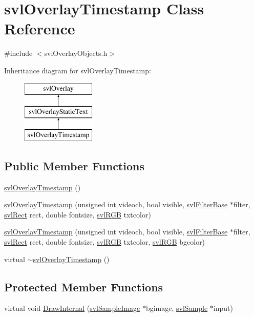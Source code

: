 \hypertarget{classsvl_overlay_timestamp}{}\section{svl\+Overlay\+Timestamp Class Reference}
\label{classsvl_overlay_timestamp}


{\ttfamily \#include $<$svl\+Overlay\+Objects.\+h$>$}

Inheritance diagram for svl\+Overlay\+Timestamp\+:\begin{figure}[H]
\begin{center}
\leavevmode
\includegraphics[height=3.000000cm]{d8/d02/classsvl_overlay_timestamp}
\end{center}
\end{figure}
\subsection*{Public Member Functions}
\begin{DoxyCompactItemize}
\item 
\hyperlink{classsvl_overlay_timestamp_a642331157995ad7952ea5b6db61d4cf6}{svl\+Overlay\+Timestamp} ()
\item 
\hyperlink{classsvl_overlay_timestamp_a999c8598ce878ec5a263d279929c88ce}{svl\+Overlay\+Timestamp} (unsigned int videoch, bool visible, \hyperlink{classsvl_filter_base}{svl\+Filter\+Base} $\ast$filter, \hyperlink{structsvl_rect}{svl\+Rect} rect, double fontsize, \hyperlink{structsvl_r_g_b}{svl\+R\+G\+B} txtcolor)
\item 
\hyperlink{classsvl_overlay_timestamp_a2dc4f64758cdc371078cf9e267bd5f2a}{svl\+Overlay\+Timestamp} (unsigned int videoch, bool visible, \hyperlink{classsvl_filter_base}{svl\+Filter\+Base} $\ast$filter, \hyperlink{structsvl_rect}{svl\+Rect} rect, double fontsize, \hyperlink{structsvl_r_g_b}{svl\+R\+G\+B} txtcolor, \hyperlink{structsvl_r_g_b}{svl\+R\+G\+B} bgcolor)
\item 
virtual \hyperlink{classsvl_overlay_timestamp_a8e7dce43e7d99a73736a87f70e91be50}{$\sim$svl\+Overlay\+Timestamp} ()
\end{DoxyCompactItemize}
\subsection*{Protected Member Functions}
\begin{DoxyCompactItemize}
\item 
virtual void \hyperlink{classsvl_overlay_timestamp_aa89bfa57017c4b2bcc790fed9aac6c9a}{Draw\+Internal} (\hyperlink{classsvl_sample_image}{svl\+Sample\+Image} $\ast$bgimage, \hyperlink{classsvl_sample}{svl\+Sample} $\ast$input)
\end{DoxyCompactItemize}
